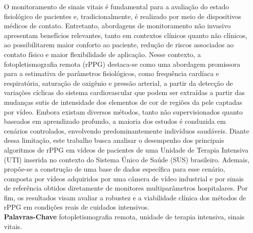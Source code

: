 \documentclass[]{politex}
\begin{document}
\begin{resumo}
O monitoramento de sinais vitais é fundamental para a avaliação do estado fisiológico de pacientes e, tradicionalmente, é realizado por meio de dispositivos médicos de contato. Entretanto, abordagens de monitoramento não invasivo apresentam benefícios relevantes, tanto em contextos clínicos quanto não clínicos, ao possibilitarem maior conforto ao paciente, redução de riscos associados ao contato físico e maior flexibilidade de aplicação. Nesse contexto, a fotopletismografia remota (rPPG) destaca-se como uma abordagem promissora para a estimativa de parâmetros fisiológicos, como frequência cardíaca e respiratória, saturação de oxigênio e pressão arterial, a partir da detecção de variações cíclicas do sistema cardiovascular que podem ser extraídas a partir das mudanças sutis de intensidade dos elementos de cor de regiões da pele captadas por vídeo. Embora existam diversos métodos, tanto não supervisionados quanto baseados em aprendizado profundo, a maioria dos estudos é conduzida em cenários controlados, envolvendo predominantemente indivíduos saudáveis. Diante dessa limitação, este trabalho busca analisar o desempenho dos principais algoritmos de rPPG em vídeos de pacientes de uma Unidade de Terapia Intensiva (UTI) inserida no contexto do Sistema Único de Saúde (SUS) brasileiro. Ademais, propõe-se a construção de uma base de dados específica para esse cenário, composta por vídeos adquiridos por uma câmera de vídeo industrial e por sinais de referência obtidos diretamente de monitores multiparâmetros hospitalares. Por fim, os resultados visam avaliar a robustez e a viabilidade clínica dos métodos de rPPG em condições reais de cuidados intensivos.
%
\\[3\baselineskip]
%
\textbf{Palavras-Chave} fotopletismografia remota, unidade de terapia intensiva, sinais vitais.
\end{resumo}
\end{document}
